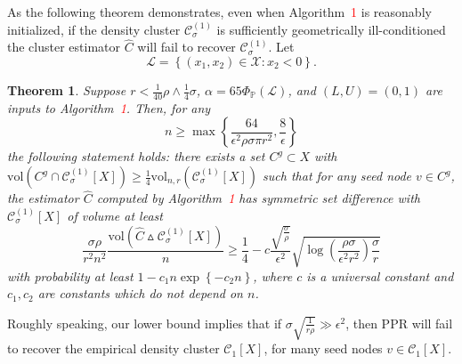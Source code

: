 \documentclass[11pt,twoside]{article}
\newtheorem{theorem}{Theorem}
\newcommand{\set}[1]{\left\{#1\right\}}
\newcommand{\vol}{\mathrm{vol}}
\newcommand{\1}{\mathbf{1}}
\newcommand{\Xbf}{X}             %
\newcommand{\Pbb}{\mathbb{P}}
\newcommand{\Cset}{\mathcal{C}}
\newcommand{\Csig}{\Cset_{\sigma}}
\begin{document}
As the following theorem demonstrates, even when Algorithm~\textcolor{red}{1} is reasonably initialized, if the density cluster $\mathcal{C}_{\sigma}^{(1)}$ is sufficiently geometrically ill-conditioned the cluster estimator $\widehat{C}$ will fail to recover $\mathcal{C}_{\sigma}^{(1)}$. Let
\begin{equation}
\label{eqn:lower_set}
\mathcal{L} = \set{(x_1,x_2) \in \mathcal{X}: x_2 < 0}.
\end{equation}
\begin{theorem}
	\label{thm:ppr_lb}
	Suppose $r < \frac{1}{40}\rho \wedge \frac{1}{4}\sigma$,  $\alpha = 65 \Phi_{\Pbb}(\mathcal{L})$, and $(L,U) = (0,1)$ are inputs to Algorithm~\textcolor{red}{1}. Then, for any
	\begin{equation}
	\label{eqn:lb_sample_size}
	n \geq \max\set{\frac{64}{\epsilon^2 \rho \sigma \pi r^2}, \frac{8}{\epsilon}}
	\end{equation}
	the following statement holds: there exists a set $C^{g} \subset \Xbf$ with $\vol(C^g \cap \mathcal{C}_{\sigma}^{(1)}[\Xbf]) \geq \frac{1}{4}\vol_{n,r}(\mathcal{C}_{\sigma}^{(1)}[\Xbf])$ such that for any seed node $v \in C^g$, the estimator $\widehat{C}$ computed by Algorithm~\textcolor{red}{1} has symmetric set difference with $\Csig^{(1)}[\Xbf]$ of volume at least
	\begin{equation}
	\label{eqn:ppr_lb}
	\frac{\sigma \rho}{r^2 n^2}\frac{\vol(\widehat{C} \vartriangle \mathcal{C}_{\sigma}^{(1)}[\Xbf])}{n} \geq \frac{1}{4} -  c \frac{\sqrt{\frac{\sigma}{\rho}}}{\epsilon^2} \sqrt{ \log\left(\frac{\rho \sigma}{\epsilon^2 r^2}\right)\frac{\sigma}{r}}
	\end{equation}
	with probability at least $1 - c_1 n \exp\set{-c_2n}$, where $c$ is a universal constant and $c_1,c_2$ are constants which do not depend on $n$.
\end{theorem}

Roughly speaking, our lower bound implies that if $\sigma\sqrt{\frac{1}{r\rho}} \gg \epsilon^2$, then PPR will fail to recover the empirical density cluster $\Cset_1[\Xbf]$, for many seed nodes $v \in \Cset_1[\Xbf]$.  
\end{document}
